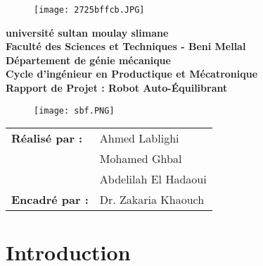 \documentclass{report}
\begin{document}
\begin{center}
    \begin{figure}[h!]
        \centering
        \texttt{[image: 2725bffcb.JPG]} %
        \label{fig:logo}
    \end{figure}

     \textbf{\textcolor{bleu}{université sultan moulay slimane}} \\
    \textbf{\textcolor{bleu}{Faculté des Sciences et Techniques - Beni Mellal}} \\
    \textbf{\textcolor{bleu}{Département de génie mécanique}} \\
    \textbf{\textcolor{bleu}{Cycle d'ingénieur en Productique et Mécatronique}} \\

    \vspace{2cm}
    \LARGE
    \textbf{Rapport de Projet : Robot Auto-Équilibrant} \\
    \vspace{0.9cm}
    \normalsize

    \begin{figure}[h!]
        \centering
        \texttt{[image: sbf.PNG]} %
      
    \end{figure}

    \begin{tabular}{l l}
        \textbf{Réalisé par :} & Ahmed Lablighi \\
                               & Mohamed Ghbal \\
                               & Abdelilah El Hadaoui \\
        \textbf{Encadré par :} & Dr. Zakaria Khaouch \\
    \end{tabular}

    \vspace{1cm}
\end{center}

\tableofcontents
\vspace{15cm}

\section*{Introduction}
\end{document}
